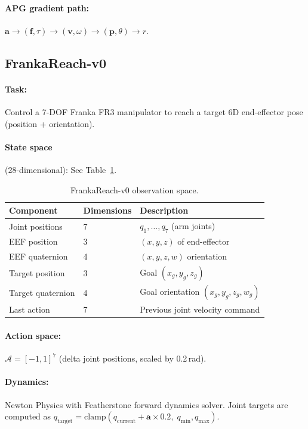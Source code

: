 \documentclass[11pt,a4paper]{article}
\newcommand{\cA}{\mathcal{A}}
\newcommand{\bvf}{\mathbf{v}}
\newcommand{\bpf}{\mathbf{p}}
\newcommand{\bff}{\mathbf{f}}
\newcommand{\ba}{\mathbf{a}}
\begin{document}
\paragraph{APG gradient path:} $\ba \rightarrow (\bff, \tau) \rightarrow (\bvf, \omega) \rightarrow (\bpf, \theta) \rightarrow r$.

\subsection{FrankaReach-v0}
\label{sec:env_franka}

\paragraph{Task:} Control a 7-DOF Franka FR3 manipulator to reach a target 6D end-effector pose (position + orientation).

\paragraph{State space} (28-dimensional): See Table~\ref{tab:fr_obs}.

\begin{table}[htbp]
  \centering
  \caption{FrankaReach-v0 observation space.}
  \label{tab:fr_obs}
  \begin{tabular}{@{}lll@{}}
    \toprule
    \textbf{Component} & \textbf{Dimensions} & \textbf{Description} \\
    \midrule
    Joint positions     & 7 & $q_1, \ldots, q_7$ (arm joints) \\
    EEF position        & 3 & $(x, y, z)$ of end-effector \\
    EEF quaternion      & 4 & $(x, y, z, w)$ orientation \\
    Target position     & 3 & Goal $(x_g, y_g, z_g)$ \\
    Target quaternion   & 4 & Goal orientation $(x_g, y_g, z_g, w_g)$ \\
    Last action         & 7 & Previous joint velocity command \\
    \bottomrule
  \end{tabular}
\end{table}

\paragraph{Action space:} $\cA = [-1, 1]^7$ (delta joint positions, scaled by 0.2\,rad).

\paragraph{Dynamics:} Newton Physics with Featherstone forward dynamics solver. Joint targets are computed as $q_{\text{target}} = \text{clamp}(q_{\text{current}} + \ba \times 0.2, \; q_{\text{min}}, q_{\text{max}})$.
\end{document}

